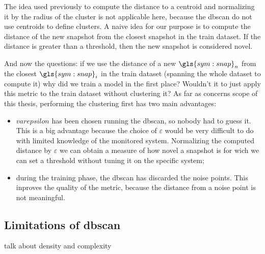The idea used previously to compute the distance to a centroid and normalizing it by the radius of the cluster is not applicable here, because the \gls{dbscan} do not use centroids to define clusters. A naive idea for our purpose is to compute the distance of the new snapshot from the closest snapshot in the train dataset.
If the distance is greater than a threshold, then the new snapshot is considered novel.

And now the questions: if we use the distance of a new $\gls{sym:snap}_n$ from the closest $\gls{sym:snap}_i$ in the train dataset (spanning the whole dataset to compute it) why did we train a model in the first place? Wouldn't it to just apply this metric to the train dataset without clustering it? As far as concerns scope of this thesis, performing the clustering first has two main advantages:
\begin{itemize}
    \item $varepsilon$ has been chosen running the \gls{dbscan}, so nobody had to guess it. This is a big advantage because the choice of $\varepsilon$ would be very difficult to do with limited knowledge of the monitored system. Normalizing the computed distance by $\varepsilon$ we can obtain a measure of how novel a snapshot is for wich we can set a threshold without tuning it on the specific system;
    \item during the training phase, the \gls{dbscan} has discarded the noise points. This inproves the quality of the metric, because the distance from a noise point is not meaningful.
\end{itemize}

\subsection{Limitations of \gls{dbscan}}
talk about density and complexity